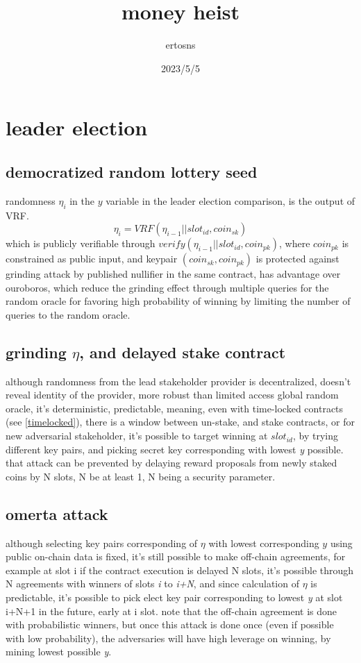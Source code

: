 \documentclass{article}
\begin{document}
\title {money heist}
\author {ertosns}
\date {2023/5/5}
\maketitle

\section {leader election}
\subsection{democratized random lottery seed}
randomness $\eta_i$ in the $y$ variable in the leader election comparison, is the output of VRF.
$$\eta_i=VRF(\eta_{i-1}||slot_{id}, coin_{sk})$$  which is publicly verifiable through $verify(\eta_{i-1}||slot_{id}, coin_{pk})$, where $coin_{pk}$ is constrained as public input, and keypair $(coin_{sk},coin_{pk})$ is protected against grinding attack by published nullifier in the same contract, has advantage over ouroboros, which reduce the grinding effect through multiple queries for the random oracle for favoring high probability of winning by limiting the number of queries to the random oracle.  \cite{ouroboros_genesis}

\subsection {grinding $\eta$, and delayed stake contract}
although randomness from the lead stakeholder provider is decentralized, doesn't reveal identity of the provider, more robust than limited access global random oracle, it's deterministic, predictable, meaning, even with time-locked contracts (see \ref{timelocked}), there is a window between un-stake, and stake contracts, or for new adversarial stakeholder, it's possible to target winning at $slot_{id}$, by trying different key pairs, and picking secret key corresponding with lowest \emph{y} possible.
that attack can be prevented by delaying reward proposals from newly staked coins by N slots, N be at least 1, N being a security parameter.

\subsection {omerta attack}
although selecting key pairs corresponding of $\eta$ with lowest corresponding $y$ using public on-chain data is fixed, it's still possible to make off-chain agreements, for example at slot i if the contract execution is delayed N slots, it's possible through N agreements with winners of slots \emph{i} to \emph{i+N}, and since calculation of $\eta$ is predictable, it's possible to pick elect key pair corresponding to lowest \emph{y} at slot i+N+1 in the future, early at i slot.
note that the off-chain agreement is done with probabilistic winners, but once this attack is done once (even if possible with low probability), the adversaries will have high leverage on winning, by mining lowest possible \emph{y}.
\end{document}
